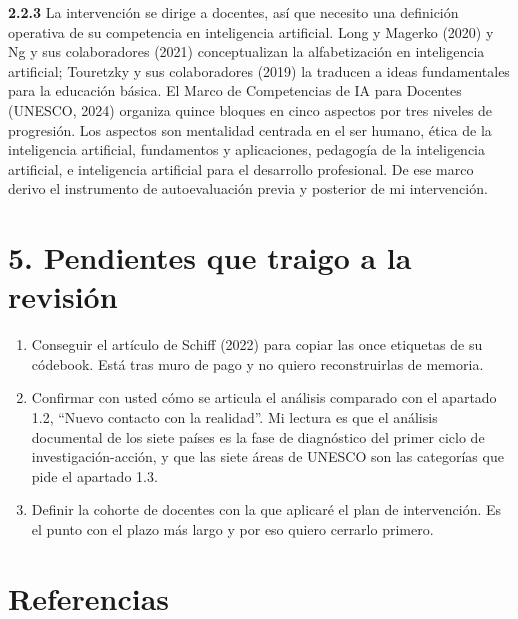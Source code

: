 \documentclass[12pt,letterpaper]{article}
\begin{document}
\textbf{2.2.3} La intervención se dirige a docentes, así que necesito una definición operativa de
su competencia en inteligencia artificial. Long y Magerko (2020) y Ng y sus colaboradores (2021)
conceptualizan la alfabetización en inteligencia artificial; Touretzky y sus colaboradores (2019)
la traducen a ideas fundamentales para la educación básica. El Marco de Competencias de IA para
Docentes (UNESCO, 2024) organiza quince bloques en cinco aspectos por tres niveles de
progresión. Los aspectos son mentalidad centrada en el ser humano, ética de la inteligencia
artificial, fundamentos y aplicaciones, pedagogía de la inteligencia artificial, e inteligencia
artificial para el desarrollo profesional. De ese marco derivo el instrumento de autoevaluación
previa y posterior de mi intervención.

\section*{5. Pendientes que traigo a la revisión}

\begin{enumerate}[leftmargin=1.5em,itemsep=4pt]
\item Conseguir el artículo de Schiff (2022) para copiar las once etiquetas de su códebook. Está
tras muro de pago y no quiero reconstruirlas de memoria.
\item Confirmar con usted cómo se articula el análisis comparado con el apartado 1.2, ``Nuevo
contacto con la realidad''. Mi lectura es que el análisis documental de los siete países es la
fase de diagnóstico del primer ciclo de investigación-acción, y que las siete áreas de UNESCO son
las categorías que pide el apartado 1.3.
\item Definir la cohorte de docentes con la que aplicaré el plan de intervención. Es el punto con
el plazo más largo y por eso quiero cerrarlo primero.
\end{enumerate}

\section*{Referencias}
\end{document}

